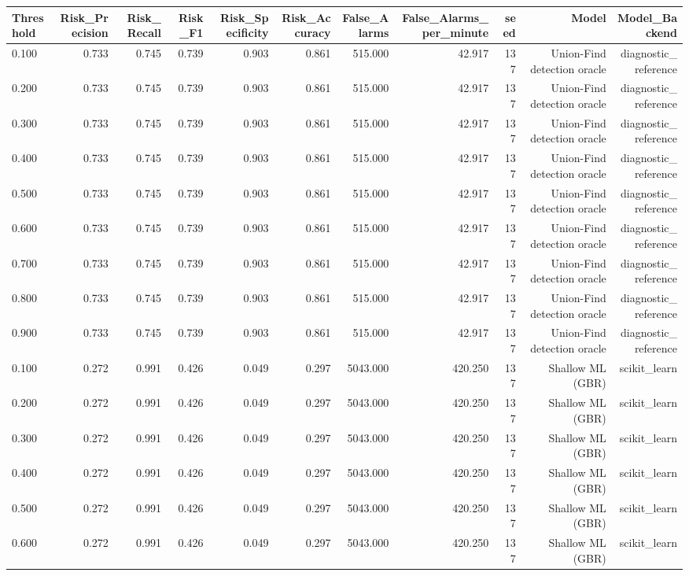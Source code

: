 \begin{tabular}{lrrrrrrrrrr}
\toprule
Threshold & Risk\_Precision & Risk\_Recall & Risk\_F1 & Risk\_Specificity & Risk\_Accuracy & False\_Alarms & False\_Alarms\_per\_minute & seed & Model & Model\_Backend \\
\midrule
0.100 & 0.733 & 0.745 & 0.739 & 0.903 & 0.861 & 515.000 & 42.917 & 137 & Union-Find detection oracle & diagnostic\_reference \\
0.200 & 0.733 & 0.745 & 0.739 & 0.903 & 0.861 & 515.000 & 42.917 & 137 & Union-Find detection oracle & diagnostic\_reference \\
0.300 & 0.733 & 0.745 & 0.739 & 0.903 & 0.861 & 515.000 & 42.917 & 137 & Union-Find detection oracle & diagnostic\_reference \\
0.400 & 0.733 & 0.745 & 0.739 & 0.903 & 0.861 & 515.000 & 42.917 & 137 & Union-Find detection oracle & diagnostic\_reference \\
0.500 & 0.733 & 0.745 & 0.739 & 0.903 & 0.861 & 515.000 & 42.917 & 137 & Union-Find detection oracle & diagnostic\_reference \\
0.600 & 0.733 & 0.745 & 0.739 & 0.903 & 0.861 & 515.000 & 42.917 & 137 & Union-Find detection oracle & diagnostic\_reference \\
0.700 & 0.733 & 0.745 & 0.739 & 0.903 & 0.861 & 515.000 & 42.917 & 137 & Union-Find detection oracle & diagnostic\_reference \\
0.800 & 0.733 & 0.745 & 0.739 & 0.903 & 0.861 & 515.000 & 42.917 & 137 & Union-Find detection oracle & diagnostic\_reference \\
0.900 & 0.733 & 0.745 & 0.739 & 0.903 & 0.861 & 515.000 & 42.917 & 137 & Union-Find detection oracle & diagnostic\_reference \\
0.100 & 0.272 & 0.991 & 0.426 & 0.049 & 0.297 & 5043.000 & 420.250 & 137 & Shallow ML (GBR) & scikit\_learn \\
0.200 & 0.272 & 0.991 & 0.426 & 0.049 & 0.297 & 5043.000 & 420.250 & 137 & Shallow ML (GBR) & scikit\_learn \\
0.300 & 0.272 & 0.991 & 0.426 & 0.049 & 0.297 & 5043.000 & 420.250 & 137 & Shallow ML (GBR) & scikit\_learn \\
0.400 & 0.272 & 0.991 & 0.426 & 0.049 & 0.297 & 5043.000 & 420.250 & 137 & Shallow ML (GBR) & scikit\_learn \\
0.500 & 0.272 & 0.991 & 0.426 & 0.049 & 0.297 & 5043.000 & 420.250 & 137 & Shallow ML (GBR) & scikit\_learn \\
0.600 & 0.272 & 0.991 & 0.426 & 0.049 & 0.297 & 5043.000 & 420.250 & 137 & Shallow ML (GBR) & scikit\_learn \\

\end{tabular}
